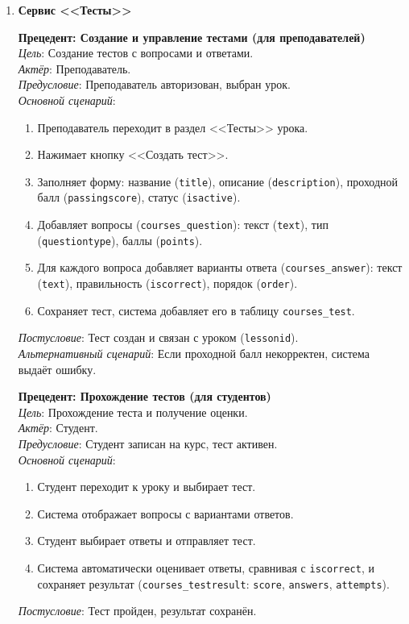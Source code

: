 \begin{enumerate}
	\item \textbf{Сервис <<Тесты>>}
	
	\textbf{Прецедент: Создание и управление тестами (для преподавателей)} \\
	\textit{Цель}: Создание тестов с вопросами и ответами. \\
	\textit{Актёр}: Преподаватель. \\
	\textit{Предусловие}: Преподаватель авторизован, выбран урок. \\
	\textit{Основной сценарий}:
	\begin{enumerate}
		\item Преподаватель переходит в раздел <<Тесты>> урока.
		\item Нажимает кнопку <<Создать тест>>.
		\item Заполняет форму: название (\texttt{title}), описание (\texttt{description}), проходной балл (\texttt{passingscore}), статус (\texttt{isactive}).
		\item Добавляет вопросы (\texttt{courses\_question}): текст (\texttt{text}), тип (\texttt{questiontype}), баллы (\texttt{points}).
		\item Для каждого вопроса добавляет варианты ответа (\texttt{courses\_answer}): текст (\texttt{text}), правильность (\texttt{iscorrect}), порядок (\texttt{order}).
		\item Сохраняет тест, система добавляет его в таблицу \texttt{courses\_test}.
	\end{enumerate}
	\textit{Постусловие}: Тест создан и связан с уроком (\texttt{lessonid}). \\
	\textit{Альтернативный сценарий}: Если проходной балл некорректен, система выдаёт ошибку.
	
	\textbf{Прецедент: Прохождение тестов (для студентов)} \\
	\textit{Цель}: Прохождение теста и получение оценки. \\
	\textit{Актёр}: Студент. \\
	\textit{Предусловие}: Студент записан на курс, тест активен. \\
	\textit{Основной сценарий}:
	\begin{enumerate}
		\item Студент переходит к уроку и выбирает тест.
		\item Система отображает вопросы с вариантами ответов.
		\item Студент выбирает ответы и отправляет тест.
		\item Система автоматически оценивает ответы, сравнивая с \texttt{iscorrect}, и сохраняет результат (\texttt{courses\_testresult}: \texttt{score}, \texttt{answers}, \texttt{attempts}).
	\end{enumerate}
	\textit{Постусловие}: Тест пройден, результат сохранён.
	

\end{enumerate}
